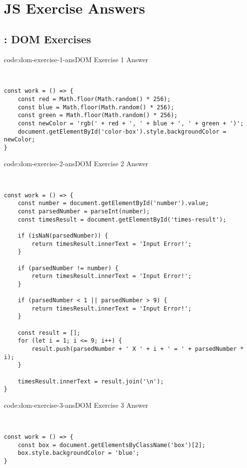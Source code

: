 \section{JS Exercise Answers} \label{sect:js-exercise-answers}

\subsection*{: DOM Exercises}

\begin{codeenv}{code:dom-exercise-1-ans}{DOM Exercise 1 Answer}\begin{verbatim}


const work = () => {
    const red = Math.floor(Math.random() * 256);
    const blue = Math.floor(Math.random() * 256);
    const green = Math.floor(Math.random() * 256);
    const newColor = 'rgb(' + red + ', ' + blue + ', ' + green + ')';
    document.getElementById('color-box').style.backgroundColor = newColor;
}
\end{verbatim}
\end{codeenv}

\begin{codeenv}{code:dom-exercise-2-ans}{DOM Exercise 2 Answer}\begin{verbatim}


const work = () => {
    const number = document.getElementById('number').value;
    const parsedNumber = parseInt(number);
    const timesResult = document.getElementById('times-result');

    if (isNaN(parsedNumber)) {
        return timesResult.innerText = 'Input Error!';
    }
    
    if (parsedNumber != number) {
        return timesResult.innerText = 'Input Error!';
    }

    if (parsedNumber < 1 || parsedNumber > 9) {
        return timesResult.innerText = 'Input Error!';
    }

    const result = [];
    for (let i = 1; i <= 9; i++) {
        result.push(parsedNumber + ' X ' + i + ' = ' + parsedNumber * i);
    }

    timesResult.innerText = result.join('\n');
}
\end{verbatim}
\end{codeenv}

\begin{codeenv}{code:dom-exercise-3-ans}{DOM Exercise 3 Answer}\begin{verbatim}


const work = () => {
    const box = document.getElementsByClassName('box')[2];
    box.style.backgroundColor = 'blue';
}
\end{verbatim}
\end{codeenv}
\pagebreak

